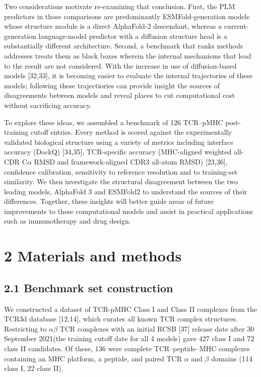 \documentclass[
  11pt,
]{article}
\begin{document}
Two considerations motivate re-examining that conclusion. First, the PLM
predictors in those comparisons are predominantly ESMFold-generation
models whose structure module is a direct AlphaFold-2 descendant,
whereas a current-generation language-model predictor with a diffusion
structure head is a substantially different architecture. Second, a
benchmark that ranks methods addresses treats them as black boxes wherein
the internal mechanisms that lead to the result are not considered. With the
increase in use of diffusion-based models {[}32,33{]}, it is becoming easier to
evaluate the internal trajectories of these models; following these trajectiories
can provide insight the sources of disagreements between models and reveal places
to cut computational cost without sacrificing accuracy.

To explore these ideas, we assembled a benchmark of 126 TCR--pMHC post-training 
cutoff entries. Every method is scored against the experimentally validated
biological structure using a variety of metrics including interface accuracy (DockQ) {[}34,35{]}, TCR-specific
accuracy (MHC-aligned weighted all-CDR C\ensuremath{\alpha} RMSD and framework-aligned
CDR3 all-atom RMSD) {[}23,36{]}, confidence calibration, sensitivity to reference
resolution and to training-set similarity. We then investigate the structural
disagreement between the two leading models, AlphaFold 3 and ESMFold2 to understand the sources of
their differences. Together, these insights will better guide areas of future improvements to these
computational models and assist in practical applications such as immunotherapy and drug design. 

\section{2 Materials and methods}\label{materials-and-methods}

\subsection{2.1 Benchmark set
construction}\label{benchmark-set-construction}

We constructed a dataset of TCR-pMHC Class I and Class II complexes from the TCR3d database {[}12,14{]}, which
curates all known TCR complex structures. Restricting to \ensuremath{\alpha}\ensuremath{\beta} TCR complexes
with an initial RCSB {[}37{]} release date after 30 September 2021(the training cutoff date for all 4 models) gave 427 class
I and 72 class II candidates. Of these, 136 were complete
TCR--peptide--MHC complexes containing an MHC platform, a peptide, 
and paired TCR \ensuremath{\alpha} and \ensuremath{\beta} domains (114 class
I, 22 class II).
\end{document}
